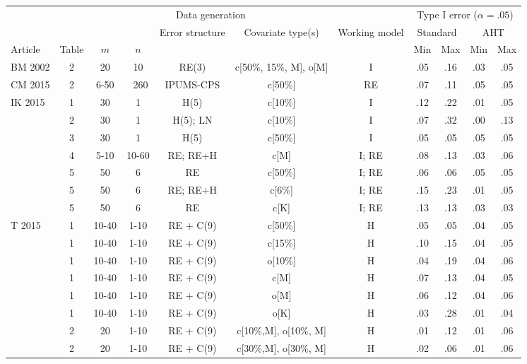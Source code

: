 \begin{tabular}{lc cccc c cccc} 
\toprule
 & & \multicolumn{4}{c}{Data generation}  & & \multicolumn{4}{c}{Type I error ($\alpha = .05$)} \\ \cmidrule{3-6} \cmidrule{8-11}
 & & & & \multirow{2}{1.5cm}{Error structure} & \multirow{2}{1.5cm}{Covariate type(s)} & \multirow{2}{1.5cm}{Working model} & \multicolumn{2}{c}{Standard} & \multicolumn{2}{c}{AHT} \\ 
Article & Table & $m$ & $n$ & & & & Min & Max & Min & Max \\ \midrule
BM 2002 & 2 & 20 & 10 & RE(3) & c[50\%, 15\%, M], o[M] & I & .05 & .16 & .03 & .05 \\
CM 2015 & 2 & 6-50 & ~260 & IPUMS-CPS & c[50\%] & RE & .07 & .11 & .05 & .05 \\ \midrule
\multirow{7}{1.5cm}{IK 2015} & 1 & 30 & 1 & H(5) & c[10\%] & I & .12 & .22 & .01 & .05 \\
& 2 & 30 & 1 & H(5); LN & c[10\%] & I & .07 & .32 & .00 & .13 \\
& 3 & 30 & 1 & H(5) & c[50\%] & I & .05 & .05 & .05 & .05 \\
& 4 & 5-10 & 10-60 & RE; RE+H & c[M] & I; RE & .08 & .13 & .03 & .06 \\
& 5 & 50 & 6 & RE & c[50\%] & I; RE & .06 & .06 & .05 & .05 \\ 
& 5 & 50 & 6 & RE; RE+H & c[6\%] & I; RE & .15 & .23 & .01 & .05 \\
& 5 & 50 & 6 & RE & c[K] & I; RE & .13 & .13 & .03 & .03 \\ \midrule
\multirow{8}{1.5cm}{T 2015} & 1 & 10-40 & 1-10 & RE + C(9) & c[50\%] & H & .05 & .05 & .04 & .05 \\
& 1 & 10-40 & 1-10 & RE + C(9) & c[15\%] & H & .10 & .15 & .04 & .05 \\
& 1 & 10-40 & 1-10 & RE + C(9) & o[10\%] & H & .04 & .19 & .04 & .06 \\
& 1 & 10-40 & 1-10 & RE + C(9) & c[M] & H & .07 & .13 & .04 & .05 \\
& 1 & 10-40 & 1-10 & RE + C(9) & o[M] & H & .06 & .12 & .04 & .06 \\ 
& 1 & 10-40 & 1-10 & RE + C(9) & o[K] & H & .03 & .28 & .01 & .04 \\
& 2 & 20 & 1-10 & RE + C(9) & c[10\%,M], o[10\%, M] & H & .01 & .12 & .01 & .06 \\
& 2 & 20 & 1-10 & RE + C(9) & c[30\%,M], o[30\%, M] & H & .02 & .06 & .01 & .06 \\
\bottomrule
\end{tabular}


